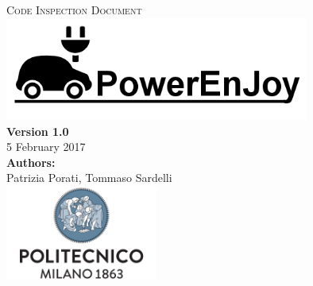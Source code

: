 \documentclass[a4paper,11pt]{article}
\begin{document}


\begin{titlepage}
\begin{center}
\textsc{\LARGE Code Inspection Document}\\[1.5cm] %

\includegraphics[width=10cm]{PowerEnJoy.png}\\
\vfill
\vfill
\textbf{Version 1.0}\\
5 February 2017\\[0.5cm]
\textbf{Authors:}\\
Patrizia Porati, Tommaso Sardelli\\[2.0cm] 


\vfill
\vfill
\includegraphics[width=50mm]{polimi.png}\\
\end{center}
\end{titlepage}

\tableofcontents
\pagebreak






\end{document}
